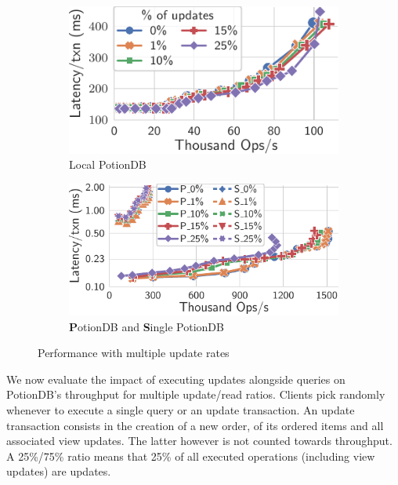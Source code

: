 \documentclass[sigconf, nonacm]{acmart}
\begin{document}
\begin{figure}
	\centering
	\begin{subfigure}{.47\linewidth}
		\includegraphics[width=1\linewidth]{singleQuery/upd_rate_local_tc_short}
		\caption{Local PotionDB}
		\label{fig:update_rates_local_tc}
	\end{subfigure}%
	\hspace*{0.2em}
	\begin{subfigure}{.52\linewidth}
		\includegraphics[width=1\linewidth]{singleQuery/upd_rate_tc_global_vs_single}
		\caption{\textbf{P}otionDB and \textbf{S}ingle PotionDB}
		\label{fig:update_rates_global_single_tc}
	\end{subfigure}%
	\vspace*{-0.65em}
	\caption{Performance with multiple update rates}
	\label{fig:upds_tc}
	\vspace*{-1.2em}
\end{figure}


We now evaluate the impact of executing updates alongside queries on PotionDB's throughput for multiple update/read ratios.
Clients pick randomly
whenever to execute a single query or an update transaction.
An update transaction consists in the creation of a new order, of its ordered items and all associated view updates.
The latter however is not counted towards throughput.
A 25\%/75\% ratio means that 25\% of all executed operations (including view updates) are updates.%
\end{document}
